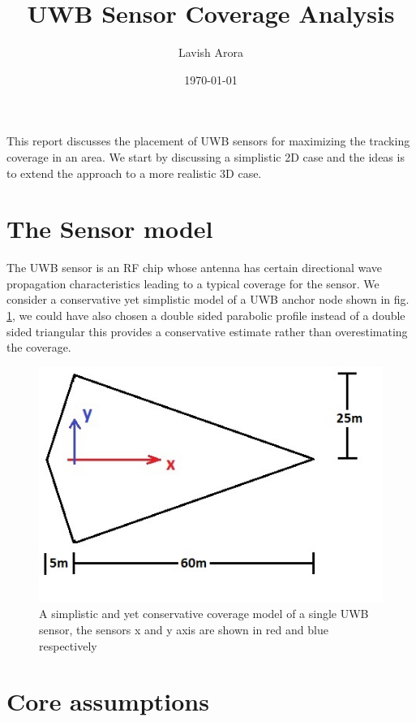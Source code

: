 \documentclass{article}
\title{UWB Sensor Coverage Analysis}
\author{Lavish Arora} %
\date{\today}
\begin{document}
\maketitle

This report discusses the placement of UWB sensors for maximizing the tracking coverage in an area. We start by discussing a simplistic 2D case and the ideas is to extend the approach to a more realistic 3D case.

\section{The Sensor model}

The UWB sensor is an RF chip whose antenna has certain directional wave propagation characteristics leading to a typical coverage for the sensor. We consider a conservative yet simplistic model of a UWB anchor node shown in fig. \ref{fig:uwb-pro}, we could have also chosen a double sided parabolic profile instead of a double sided triangular this provides a conservative estimate rather than overestimating the coverage.

\begin{figure}[!h]
	\centering
	\includegraphics[scale=0.6]{img/uwb-sensor-profile.jpg}
	\caption{A simplistic and yet conservative coverage model of a single UWB sensor, the sensors x and y axis are shown in red and blue respectively}
	\label{fig:uwb-pro}
\end{figure}

\section{Core assumptions}
\end{document}
